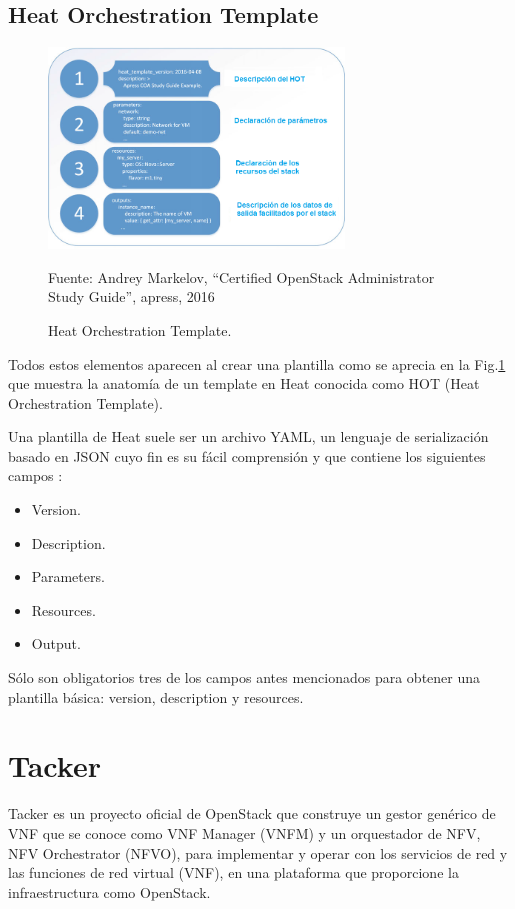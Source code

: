 \subsection{Heat Orchestration Template}

\begin{figure}
    \centering
    \includegraphics[width=0.7\textwidth]{imagenes/capitulo4/heat_template.png}
    \caption{Heat Orchestration Template.}
	\vspace{0.3cm}
    \footnotesize{Fuente: Andrey Markelov, “Certified OpenStack Administrator Study Guide”, apress, 2016 }
    \label{heat_template}
\end{figure}

Todos estos elementos aparecen al crear una plantilla como se aprecia en la Fig.\ref{heat_template} que muestra la anatomía de un template en Heat conocida como HOT (Heat Orchestration Template).

Una plantilla de Heat suele ser un archivo YAML, un lenguaje de serialización basado en JSON cuyo fin es su fácil comprensión y que contiene los siguientes campos \cite{dorn_horizon_2017}:

\begin{itemize}
\item Version.
\item Description.
\item Parameters.
\item Resources.
\item Output.
\end{itemize}

Sólo son obligatorios tres de los campos antes mencionados para obtener una plantilla básica: version, description y resources. 

\section{Tacker}
Tacker es un proyecto oficial de OpenStack que construye un gestor genérico de VNF que se conoce como VNF Manager (VNFM) y un orquestador de NFV, NFV Orchestrator (NFVO), para implementar y operar con los servicios de red y las funciones de red virtual (VNF), en una plataforma que proporcione la infraestructura como OpenStack. 

